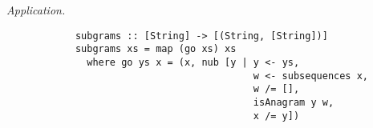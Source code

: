 \begin{parts}
\begin{subparts}
		\begin{solution}
			\emph{Application.}
			\begin{verbatim}
			subgrams :: [String] -> [(String, [String])]
			subgrams xs = map (go xs) xs 
			  where go ys x = (x, nub [y | y <- ys, 
			                               w <- subsequences x, 
			                               w /= [], 
			                               isAnagram y w, 
			                               x /= y])
			
			\end{verbatim}
		\end{solution}
		
	\end{subparts}

\end{parts}
